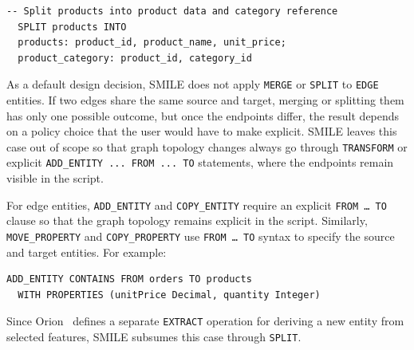   \begin{lstlisting}[basicstyle=\small\ttfamily]
  -- Split products into product data and category reference
  SPLIT products INTO
  products: product_id, product_name, unit_price;
  product_category: product_id, category_id
  \end{lstlisting}

As a default design decision, SMILE does not apply \texttt{MERGE} or \texttt{SPLIT} to \texttt{EDGE}
  entities. If two edges share the same source and target, merging or splitting them has only one
  possible outcome, but once the endpoints differ, the result depends on a policy choice that the
  user would have to make explicit. SMILE leaves this case out of scope so that graph topology
  changes always go through \texttt{TRANSFORM} or explicit \texttt{ADD\_ENTITY ... FROM ... TO}
  statements, where the endpoints remain visible in the script.

  For edge entities, \texttt{ADD\_ENTITY} and \texttt{COPY\_ENTITY} require an explicit \texttt{FROM \ldots\ TO} clause so that the graph topology
  remains explicit in the script. Similarly, \texttt{MOVE\_PROPERTY} and \texttt{COPY\_PROPERTY} use \texttt{FROM \ldots\ TO} syntax to specify the
  source and target entities. For example:

  \begin{lstlisting}[basicstyle=\small\ttfamily]
  ADD_ENTITY CONTAINS FROM orders TO products
  WITH PROPERTIES (unitPrice Decimal, quantity Integer)
  \end{lstlisting}

  Since Orion~\cite{chillon2022taxonomy} defines a separate \texttt{EXTRACT} operation for deriving a new entity from selected features, SMILE
  subsumes this case through \texttt{SPLIT}.

